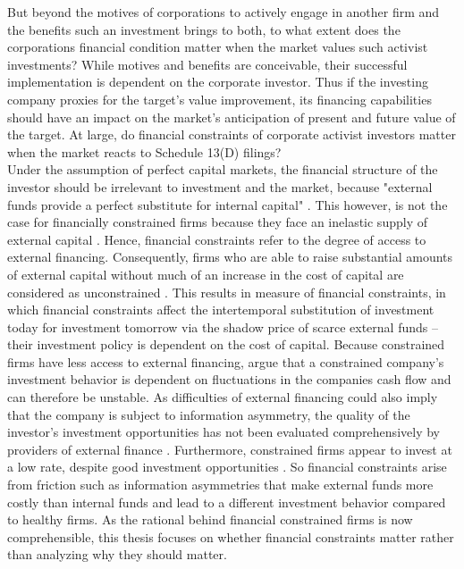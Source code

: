 \documentclass[12pt]{article}
\begin{document}
But beyond the motives of corporations to actively engage in another firm and the benefits such an investment brings to both, to what extent does the corporations financial condition matter when the market values such activist investments?  While motives and benefits are conceivable, their successful implementation is dependent on the corporate investor. 
Thus if the investing company proxies for the target's value improvement, its financing capabilities should have an impact on the market's anticipation of present and future value of the target. At large, do financial constraints of corporate activist investors matter when the market reacts to Schedule 13(D) filings?\\
Under the assumption of perfect capital markets, the financial structure of the investor should be irrelevant to investment and the market, because "external funds provide a perfect substitute for internal capital" \citep[p. 141]{Fazzari1988}. This however, is not the case for financially constrained firms because they face an inelastic supply of external capital \citep[p.1]{Farre-mensa2013}. Hence, financial constraints refer to the degree of access to external financing. Consequently, firms who are able to raise substantial amounts of external capital without much of an increase in the cost of capital are considered as unconstrained \citep[p.1]{Farre-mensa2013}. This results in \citet[p.531]{Whited2006} measure of financial constraints, in which financial constraints affect the intertemporal substitution of investment today for investment tomorrow via the shadow price of scarce external funds -- their investment policy is dependent on the cost of capital. Because constrained firms have less access to external financing, \citet[p. 142]{Fazzari1988} argue that a constrained company's investment behavior is dependent on fluctuations in the companies cash flow and can therefore be unstable. As difficulties of external financing could also imply that the company is subject to information asymmetry, the quality of the investor's investment opportunities has not been evaluated comprehensively by providers of external finance \citep[p.142]{Fazzari1988}. Furthermore, constrained firms appear to invest at a low rate, despite good investment opportunities \citep[p.533]{Whited2006}. 
So financial constraints arise from friction such as information asymmetries that make external funds more costly than internal funds and lead to a different investment behavior compared to healthy firms. As the rational behind financial constrained firms is now comprehensible, this thesis focuses on whether financial constraints matter rather than analyzing why they should matter. 
\end{document}
